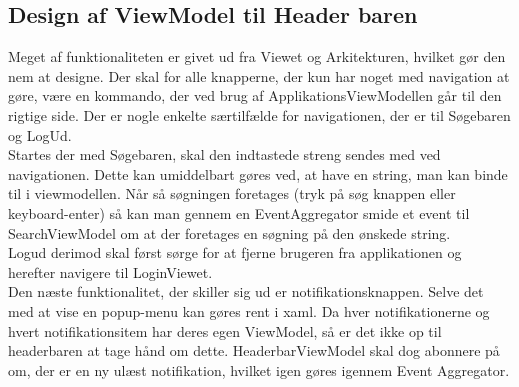 \documentclass[SoftwareDesign/SoftwareDesign_main.tex]{subfiles}
\begin{document}
\subsection{Design af ViewModel til Header baren}
Meget af funktionaliteten er givet ud fra Viewet og Arkitekturen, hvilket gør den nem at designe. Der skal for alle knapperne, der kun har noget med navigation at gøre, være en kommando, der ved brug af ApplikationsViewModellen går til den rigtige side. Der er nogle enkelte særtilfælde for navigationen, der er til Søgebaren og LogUd.\\

Startes der med Søgebaren, skal den indtastede streng sendes med ved navigationen. Dette kan umiddelbart gøres ved, at have en string, man kan binde til i viewmodellen. Når så søgningen foretages (tryk på søg knappen eller keyboard-enter) så kan man gennem en EventAggregator smide et event til SearchViewModel om at der foretages en søgning  på den ønskede string.\\

Logud derimod skal først sørge for at fjerne brugeren fra applikationen og herefter navigere til LoginViewet.\\

Den næste funktionalitet, der skiller sig ud er notifikationsknappen. Selve det med at vise en popup-menu kan gøres rent i xaml. Da hver notifikationerne og hvert notifikationsitem har deres egen ViewModel, så er det ikke op til headerbaren at tage hånd om dette. HeaderbarViewModel skal dog abonnere på om, der er en ny ulæst notifikation, hvilket igen gøres igennem Event Aggregator.
\end{document}
